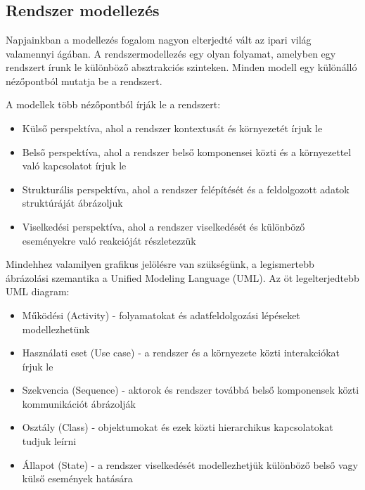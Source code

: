 \chapter{\bevezetes}
\section{Rendszer modellezés}

Napjainkban a modellezés fogalom nagyon elterjedté vált az ipari világ valamennyi ágában. A rendszermodellezés egy olyan folyamat, amelyben egy rendszert írunk le különböző absztrakciós szinteken. Minden modell egy különálló nézőpontból mutatja be a rendszert.

A modellek több nézőpontból írják le a rendszert:
 \begin{itemize}
 	\item Külső perspektíva, ahol a rendszer kontextusát és környezetét írjuk le
 	\item Belső perspektíva, ahol a rendszer belső komponensei közti és a környezettel való kapcsolatot írjuk le
 	\item Strukturális perspektíva, ahol a rendszer felépítését és a feldolgozott adatok struktúráját ábrázoljuk
 	\item Viselkedési perspektíva, ahol a rendszer viselkedését és különböző eseményekre való reakcióját részletezzük
 \end{itemize}

Mindehhez valamilyen grafikus jelölésre van szükségünk, a legismertebb ábrázolási szemantika a Unified Modeling Language (UML). Az öt legelterjedtebb UML diagram:
 \begin{itemize}
	\item Működési (Activity) - folyamatokat és adatfeldolgozási lépéseket modellezhetünk
	\item Használati eset (Use case) - a rendszer és a környezete közti interakciókat írjuk le
	\item Szekvencia (Sequence) - aktorok és rendszer továbbá belső komponensek közti kommunikációt ábrázolják
	\item Osztály (Class) - objektumokat és ezek közti hierarchikus kapcsolatokat tudjuk leírni
	\item Állapot (State) - a rendszer viselkedését modellezhetjük különböző belső vagy külső események hatására
\end{itemize}

